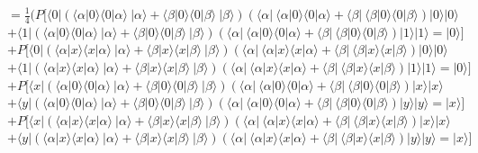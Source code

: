 \documentclass[a4paper]{scrartcl}
\begin{document}
\begin{enumerate}[a)]
$=\frac{1}{4} (P[ \langle 0|(\langle \alpha|0\rangle \langle 0|\alpha\rangle~|\alpha\rangle + \langle \beta|0\rangle \langle 0|\beta\rangle~|\beta\rangle) (\langle \alpha|~\langle \alpha|0\rangle \langle 0|\alpha\rangle + \langle \beta|~\langle \beta|0\rangle \langle 0|\beta\rangle)|0\rangle |0\rangle$\\
$+ \langle 1|(\langle \alpha|0\rangle \langle 0|\alpha\rangle~|\alpha\rangle + \langle \beta|0\rangle \langle 0|\beta\rangle~|\beta\rangle) (\langle \alpha|~\langle \alpha|0\rangle \langle 0|\alpha\rangle + \langle \beta|~\langle \beta|0\rangle \langle 0|\beta\rangle)|1\rangle |1\rangle =|0\rangle]$\\
$+P[ \langle 0|(\langle \alpha|x\rangle \langle x|\alpha\rangle~|\alpha\rangle + \langle \beta|x\rangle \langle x|\beta\rangle~|\beta\rangle) (\langle \alpha|~\langle \alpha|x\rangle \langle x|\alpha\rangle + \langle \beta|~\langle \beta|x\rangle \langle x|\beta\rangle)|0\rangle |0\rangle$\\
$+ \langle 1|(\langle \alpha|x\rangle \langle x|\alpha\rangle~|\alpha\rangle + \langle \beta|x\rangle \langle x|\beta\rangle~|\beta\rangle) (\langle \alpha|~\langle \alpha|x\rangle \langle x|\alpha\rangle + \langle \beta|~\langle \beta|x\rangle \langle x|\beta\rangle)|1\rangle |1\rangle =|0\rangle]$\\
$+ P[ \langle x|(\langle \alpha|0\rangle \langle 0|\alpha\rangle~|\alpha\rangle + \langle \beta|0\rangle \langle 0|\beta\rangle~|\beta\rangle) (\langle \alpha|~\langle \alpha|0\rangle \langle 0|\alpha\rangle + \langle \beta|~\langle \beta|0\rangle \langle 0|\beta\rangle)|x\rangle |x\rangle$\\
$+ \langle y|(\langle \alpha|0\rangle \langle 0|\alpha\rangle~|\alpha\rangle + \langle \beta|0\rangle \langle 0|\beta\rangle~|\beta\rangle) (\langle \alpha|~\langle \alpha|0\rangle \langle 0|\alpha\rangle + \langle \beta|~\langle \beta|0\rangle \langle 0|\beta\rangle)|y\rangle |y\rangle =|x\rangle]$\\
$+P[ \langle x|(\langle \alpha|x\rangle \langle x|\alpha\rangle~|\alpha\rangle + \langle \beta|x\rangle \langle x|\beta\rangle~|\beta\rangle) (\langle \alpha|~\langle \alpha|x\rangle \langle x|\alpha\rangle + \langle \beta|~\langle \beta|x\rangle \langle x|\beta\rangle)|x\rangle |x\rangle$\\
$+ \langle y|(\langle \alpha|x\rangle \langle x|\alpha\rangle~|\alpha\rangle + \langle \beta|x\rangle \langle x|\beta\rangle~|\beta\rangle) (\langle \alpha|~\langle \alpha|x\rangle \langle x|\alpha\rangle + \langle \beta|~\langle \beta|x\rangle \langle x|\beta\rangle)|y\rangle |y\rangle =|x\rangle]$\\



\end{enumerate}
\end{document}
